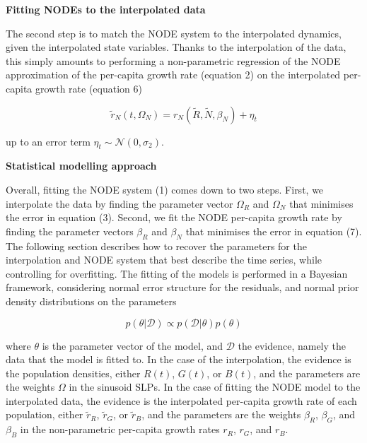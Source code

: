 \documentclass[11pt, oneside]{article}
\begin{document}

\textbf{Fitting NODEs to the interpolated data}

The second step is to match the NODE system to the interpolated dynamics, given the interpolated state variables.
Thanks to the interpolation of the data, this simply amounts to performing a non-parametric regression of the NODE approximation of the per-capita growth rate (equation 2) on the interpolated per-capita growth rate (equation 6)

\begin{equation}
    \tilde{r}_N (t,\Omega_N) = r_N \left( \tilde{R},\tilde{N},\beta_N \right) + \eta_t
\end{equation}

up to an error term $\eta_t \sim \mathcal{N}(0,\sigma_2)$. 

\textbf{Statistical modelling approach}

Overall, fitting the NODE system (1) comes down to two steps. 
First, we interpolate the data by finding the parameter vector $\Omega_R$ and $\Omega_N$ that minimises the error in equation (3).
Second, we fit the NODE per-capita growth rate by finding the parameter vectors $\beta_R$ and $\beta_N$ that minimises the error in equation (7).
The following section describes how to recover the parameters for the interpolation and NODE system that best describe the time series, while controlling for overfitting. 
The fitting of the models is performed in a Bayesian framework, considering normal error structure for the residuals, and normal prior density distributions on the parameters

\begin{equation}
	p(\theta | \mathcal{D}) \propto  p(\mathcal{D} | \theta) p(\theta)
\end{equation}

where $\theta$ is the parameter vector of the model, and $\mathcal{D}$ the evidence, namely the data that the model is fitted to.
In the case of the interpolation, the evidence is the population densities, either $R(t)$, $G(t)$, or $B(t)$, and the parameters are the weights $\Omega$ in the sinusoid SLPs.
In the case of fitting the NODE model to the interpolated data, the evidence is the interpolated per-capita growth rate of each population, either $\tilde{r}_R$, $\tilde{r}_G$, or $\tilde{r}_B$, and the parameters are the weights $\beta_R$, $\beta_G$, and $\beta_B$ in the non-parametric per-capita growth rates $r_R$, $r_G$, and $r_B$.
\end{document}
